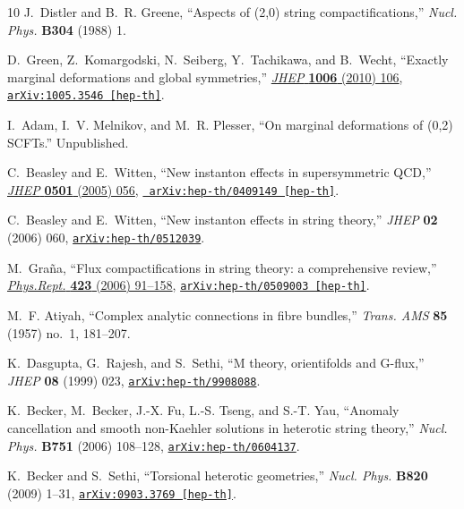\documentclass[11pt, a4paper]{article}
\begin{document}
\begin{thebibliography}{10}
J.~Distler and B.~R. Greene, ``{Aspects of (2,0) string compactifications},''
{\em Nucl. Phys.} {\bf B304} (1988)  1.

D.~Green, Z.~Komargodski, N.~Seiberg, Y.~Tachikawa, and B.~Wecht, ``{Exactly
  marginal deformations and global symmetries},''
  \href{http://dx.doi.org/10.1007/JHEP06(2010)106}{{\em JHEP} {\bf 1006} (2010)
   106}, \href{http://arxiv.org/abs/1005.3546}{{\tt arXiv:1005.3546 [hep-th]}}.

I.~Adam, I.~V. Melnikov, and M.~R. Plesser, ``{On marginal deformations of
  (0,2) SCFTs}.'' Unpublished.

C.~Beasley and E.~Witten, ``{New instanton effects in supersymmetric QCD},''
  \href{http://dx.doi.org/10.1088/1126-6708/2005/01/056}{{\em JHEP} {\bf 0501}
  (2005)  056}, \href{http://arxiv.org/abs/hep-th/0409149}{{\tt
  arXiv:hep-th/0409149 [hep-th]}}.

C.~Beasley and E.~Witten, ``{New instanton effects in string theory},'' {\em
  JHEP} {\bf 02} (2006)  060,
\href{http://arxiv.org/abs/hep-th/0512039}{{\tt arXiv:hep-th/0512039}}.

M.~Gra{\~n}a, ``{Flux compactifications in string theory: a comprehensive
  review},'' \href{http://dx.doi.org/10.1016/j.physrep.2005.10.008}{{\em
  Phys.Rept.} {\bf 423} (2006)  91--158},
  \href{http://arxiv.org/abs/hep-th/0509003}{{\tt arXiv:hep-th/0509003
  [hep-th]}}.

M.~F. Atiyah, ``Complex analytic connections in fibre bundles,'' {\em Trans.
  AMS} {\bf 85} (1957) no.~1, 181--207.

K.~Dasgupta, G.~Rajesh, and S.~Sethi, ``{M theory, orientifolds and G-flux},''
  {\em JHEP} {\bf 08} (1999)  023,
\href{http://arxiv.org/abs/hep-th/9908088}{{\tt arXiv:hep-th/9908088}}.

K.~Becker, M.~Becker, J.-X. Fu, L.-S. Tseng, and S.-T. Yau, ``{Anomaly
  cancellation and smooth non-Kaehler solutions in heterotic string theory},''
  {\em Nucl. Phys.} {\bf B751} (2006)  108--128,
\href{http://arxiv.org/abs/hep-th/0604137}{{\tt arXiv:hep-th/0604137}}.

K.~Becker and S.~Sethi, ``{Torsional heterotic geometries},'' {\em Nucl. Phys.}
  {\bf B820} (2009)  1--31,
\href{http://arxiv.org/abs/0903.3769}{{\tt arXiv:0903.3769 [hep-th]}}.


\end{thebibliography}
\end{document}

